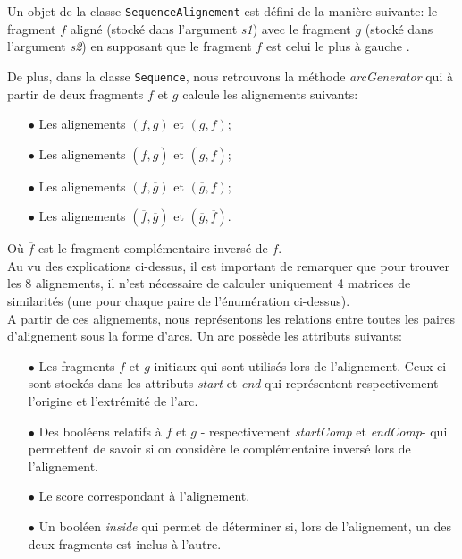 Un objet de la classe \verb|SequenceAlignement| est défini de la manière
suivante: le fragment $f$ aligné (stocké dans l'argument \emph{s1}) avec le fragment $g$ (stocké dans l'argument \emph{s2}) en supposant que le
fragment $f$ est celui le plus à \og gauche \fg.

De plus,  dans la classe \verb|Sequence|, nous retrouvons la méthode \emph{arcGenerator} qui à partir de deux fragments $f$ et $g$ calcule les alignements suivants:\\
\begin{itemize}
	\item[$\bullet$] Les alignements $(f,g)$ et $(g,f)$;
	\item[$\bullet$] Les alignements $(\overline{f},g)$ et $(g, \overline{f})$;
	\item[$\bullet$] Les alignements $(f, \overline{g})$ et $(\overline{g},f)$;
	\item[$\bullet$] Les alignements  $(\overline{f}, \overline{g})$ et $(\overline{g}, \overline{f})$.
\end{itemize}
Où $\overline{f}$ est le fragment complémentaire inversé de $f$.\\
Au vu des explications ci-dessus, il est important de remarquer que pour trouver les 8 alignements, il n'est nécessaire de calculer uniquement 4 matrices de similarités (une pour chaque paire de l'énumération ci-dessus).\\

A partir de ces alignements, nous représentons les relations entre toutes les paires d'alignement sous la forme d'arcs. Un arc possède les attributs suivants:\\

\begin{itemize}
	\item[$\bullet$] Les fragments $f$ et $g$ initiaux qui sont utilisés lors de l'alignement. Ceux-ci sont stockés dans les attributs \emph{start} et \emph{end} qui représentent respectivement l'origine et l'extrémité de l'arc.
	\item[$\bullet$] Des booléens relatifs à $f$ et $g$ - respectivement \emph{startComp} et \emph{endComp}- qui permettent de savoir si on considère le complémentaire inversé lors de l'alignement.
	\item[$\bullet$] Le score correspondant à l'alignement.
	\item[$\bullet$] Un booléen \emph{inside} qui permet de déterminer si, lors de l'alignement, un des deux fragments est inclus à l'autre.
	
\end{itemize}

